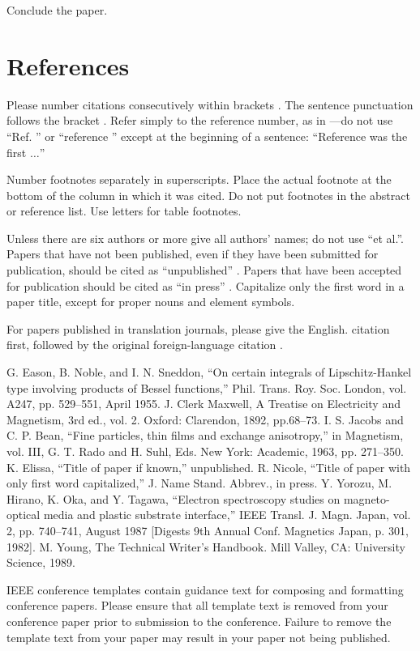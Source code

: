 \documentclass[conference]{IEEEtran}
\begin{document}
Conclude the paper.

\section*{References}

Please number citations consecutively within brackets \cite{b1}. The 
sentence punctuation follows the bracket \cite{b2}. Refer simply to the reference 
number, as in \cite{b3}---do not use ``Ref. \cite{b3}'' or ``reference \cite{b3}'' except at 
the beginning of a sentence: ``Reference \cite{b3} was the first $\ldots$''

Number footnotes separately in superscripts. Place the actual footnote at 
the bottom of the column in which it was cited. Do not put footnotes in the 
abstract or reference list. Use letters for table footnotes.

Unless there are six authors or more give all authors' names; do not use 
``et al.''. Papers that have not been published, even if they have been 
submitted for publication, should be cited as ``unpublished'' \cite{b4}. Papers 
that have been accepted for publication should be cited as ``in press'' \cite{b5}. 
Capitalize only the first word in a paper title, except for proper nouns and 
element symbols.

For papers published in translation journals, please give the English.
citation first, followed by the original foreign-language citation \cite{b6}.

\begin{thebibliography}{99}
 G. Eason, B. Noble, and I. N. Sneddon, ``On certain integrals of Lipschitz-Hankel type involving products of Bessel functions,'' Phil. Trans. Roy. Soc. London, vol. A247, pp. 529--551, April 1955.
 J. Clerk Maxwell, A Treatise on Electricity and Magnetism, 3rd ed., vol. 2. Oxford: Clarendon, 1892, pp.68--73.
 I. S. Jacobs and C. P. Bean, ``Fine particles, thin films and exchange anisotropy,'' in Magnetism, vol. III, G. T. Rado and H. Suhl, Eds. New York: Academic, 1963, pp. 271--350.
 K. Elissa, ``Title of paper if known,'' unpublished.
 R. Nicole, ``Title of paper with only first word capitalized,'' J. Name Stand. Abbrev., in press.
 Y. Yorozu, M. Hirano, K. Oka, and Y. Tagawa, ``Electron spectroscopy studies on magneto-optical media and plastic substrate interface,'' IEEE Transl. J. Magn. Japan, vol. 2, pp. 740--741, August 1987 [Digests 9th Annual Conf. Magnetics Japan, p. 301, 1982].
 M. Young, The Technical Writer's Handbook. Mill Valley, CA: University Science, 1989.
\end{thebibliography}
\vspace{12pt}
\color{red}
IEEE conference templates contain guidance text for composing and formatting conference papers. Please ensure that all template text is removed from your conference paper prior to submission to the conference. Failure to remove the template text from your paper may result in your paper not being published.
\end{document}
